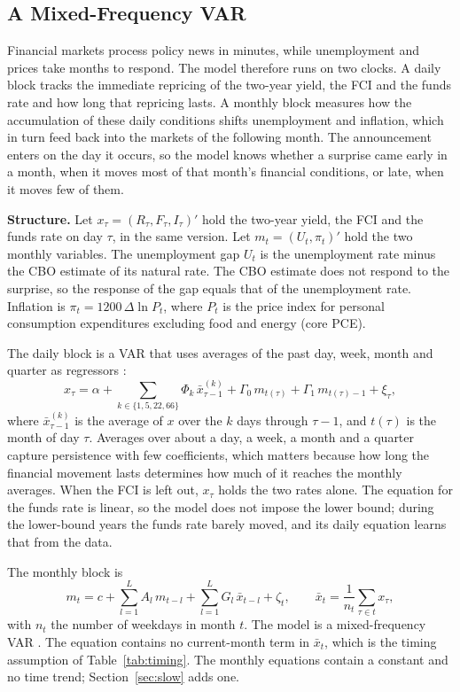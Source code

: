 \documentclass[11pt]{article}
\begin{document}
\subsection{A Mixed-Frequency VAR}\label{sec:midas}
Financial markets process policy news in minutes, while unemployment and prices take months to respond. The model therefore runs on two clocks. A daily block tracks the immediate repricing of the two-year yield, the FCI and the funds rate and how long that repricing lasts. A monthly block measures how the accumulation of these daily conditions shifts unemployment and inflation, which in turn feed back into the markets of the following month. The announcement enters on the day it occurs, so the model knows whether a surprise came early in a month, when it moves most of that month's financial conditions, or late, when it moves few of them.

\textbf{Structure.} Let $x_\tau=(R_\tau,F_\tau,I_\tau)'$ hold the two-year yield, the FCI and the funds rate on day $\tau$, in the same version. Let $m_t=(U_t,\pi_t)'$ hold the two monthly variables. The unemployment gap $U_t$ is the unemployment rate minus the CBO estimate of its natural rate. The CBO estimate does not respond to the surprise, so the response of the gap equals that of the unemployment rate. Inflation is $\pi_t=1200\,\Delta\ln P_t$, where $P_t$ is the price index for personal consumption expenditures excluding food and energy (core PCE).

The daily block is a VAR that uses averages of the past day, week, month and quarter as regressors \citep{corsi2009}:
\begin{equation}
x_\tau = \alpha + \sum_{k\in\{1,5,22,66\}} \Phi_k\, \bar x_{\tau-1}^{(k)} + \Gamma_0\, m_{t(\tau)} + \Gamma_1\, m_{t(\tau)-1} + \xi_\tau, \label{eq:daily}
\end{equation}
where $\bar x_{\tau-1}^{(k)}$ is the average of $x$ over the $k$ days through $\tau-1$, and $t(\tau)$ is the month of day $\tau$. Averages over about a day, a week, a month and a quarter capture persistence with few coefficients, which matters because how long the financial movement lasts determines how much of it reaches the monthly averages. When the FCI is left out, $x_\tau$ holds the two rates alone. The equation for the funds rate is linear, so the model does not impose the lower bound; during the lower-bound years the funds rate barely moved, and its daily equation learns that from the data.

The monthly block is
\begin{equation}
m_t = c + \sum_{l=1}^{L} A_l\, m_{t-l} + \sum_{l=1}^{L} G_l\, \bar x_{t-l} + \zeta_t, \qquad \bar x_{t}=\frac{1}{n_t}\sum_{\tau\in t} x_\tau, \label{eq:monthly}
\end{equation}
with $n_t$ the number of weekdays in month $t$. The model is a mixed-frequency VAR \citep{ghysels2016}. The equation contains no current-month term in $\bar x_t$, which is the timing assumption of Table~\ref{tab:timing}. The monthly equations contain a constant and no time trend; Section~\ref{sec:slow} adds one.
\end{document}
